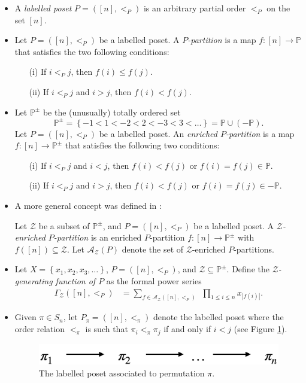 \documentclass[numbers=enddot,12pt,final,onecolumn,notitlepage]{scrartcl}%
\newcommand{\PP}{\mathbb{P}} %
\newcommand{\calA}{\mathcal{A}}
\newcommand{\set}[1]{\left\{ #1 \right\}}
\newcommand{\tup}[1]{\left( #1 \right)}
\newcommand{\defn}[1]{{\color{darkred}\emph{#1}}}
\newcommand{\0}{\phantom{c}}
\let\sumnonlimits\sum
\let\prodnonlimits\prod
\renewcommand{\sum}{\sumnonlimits\limits}
\renewcommand{\prod}{\prodnonlimits\limits}
\begin{document}
\begin{itemize}
\item A \defn{labelled poset} $P=([n],<_P)$ is an arbitrary partial order $<_P$ on the set $[n]$. 
\item Let $P = ([n],<_P)$ be a labelled poset.
A \defn{$P$-partition} is a map $f: [n]\longrightarrow \PP$ that satisfies the two following conditions:
\begin{itemize}
\item[(i)] If $i <_P j$, then $f(i) \leq f(j)$.
\item[(ii)] If $i <_P j$ and $i > j$, then $f(i) < f(j)$.
\end{itemize}
\item Let \defn{$\PP^{\pm}$} be the (unusually) totally ordered set
\[
\PP^{\pm} = \set{-1<1<-2<2<-3<3<\dots}
= \PP \cup \tup{-\PP}.
\]
Let $P = ([n],<_P)$ be a labelled poset.
An \defn{enriched $P$-partition} is a map $f: [n]\longrightarrow \PP^{\pm} $ that satisfies the following two conditions:
\begin{itemize}
\item[(i)] If $i <_P j$ and $i < j$, then $f(i) < f(j)$ or $f(i) = f(j) \in \PP$.
\item[(ii)] If $i <_P j$ and $i>j$, then $f(i) < f(j)$ or $f(i) = f(j) \in -\PP$.
\end{itemize} 
\item A more general concept was defined in \cite{Gri18}:

Let $\mathcal{Z}$ be a subset of %
$\PP^{\pm}$, and $P=([n],<_P)$ be a labelled poset.
A \defn{$\mathcal{Z}$-enriched $P$-partition} is
an enriched $P$-partition $f : [n] \longrightarrow \PP^{\pm} $ with $f([n]) \subseteq \mathcal{Z}$.
Let \defn{$\calA_\mathcal{Z}(P)$} denote the set of $\mathcal{Z}$-enriched $P$-partitions.

\item Let $X = \left\{x_1,x_2,x_3,\ldots\right\}$, $P =([n],<_P)$, and $\mathcal{Z} \subseteq \PP^{\pm}$. Define the  \defn{$\mathcal{Z}$-generating function of $P$} as the formal power series
\begin{align}
\label{eq : GammaTrad}
\Gamma_{\mathcal{Z}}([n], <_P) &= \sum_{f \in \calA_\mathcal{Z}([n],<_P)}\ \ \prod_{1\leq i \leq n}x_{|f(i)|} .
\end{align}
\item Given $\pi \in S_n$, let $P_\pi = ([n],<_\pi)$ denote the labelled poset where the order relation $<_\pi$ is such that $\pi_i <_\pi \pi_j$ if and only if $i < j$ (see Figure \ref{fig : ppart}).
\begin{figure}[htbp]
\begin{center}
 \includegraphics[scale=0.20]{PPart}\caption{The labelled poset associated to permutation $\pi$.}
 \label{fig : ppart}
 \end{center}
 \end{figure}


\end{itemize}
\end{document}
